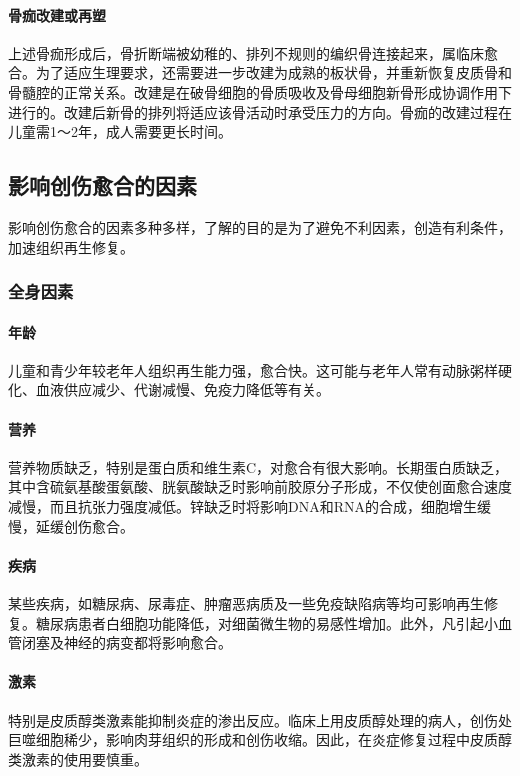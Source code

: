 \paragraph{骨痂改建或再塑}
上述骨痂形成后，骨折断端被幼稚的、排列不规则的编织骨连接起来，属临床愈合。为了适应生理要求，还需要进一步改建为成熟的板状骨，并重新恢复皮质骨和骨髓腔的正常关系。改建是在破骨细胞的骨质吸收及骨母细胞新骨形成协调作用下进行的。改建后新骨的排列将适应该骨活动时承受压力的方向。骨痂的改建过程在儿童需1～2年，成人需要更长时间。

\subsection{影响创伤愈合的因素}

影响创伤愈合的因素多种多样，了解的目的是为了避免不利因素，创造有利条件，加速组织再生修复。

\subsubsection{全身因素}

\paragraph{年龄}
儿童和青少年较老年人组织再生能力强，愈合快。这可能与老年人常有动脉粥样硬化、血液供应减少、代谢减慢、免疫力降低等有关。

\paragraph{营养}
营养物质缺乏，特别是蛋白质和维生素C，对愈合有很大影响。长期蛋白质缺乏，其中含硫氨基酸蛋氨酸、胱氨酸缺乏时影响前胶原分子形成，不仅使创面愈合速度减慢，而且抗张力强度减低。锌缺乏时将影响DNA和RNA的合成，细胞增生缓慢，延缓创伤愈合。

\paragraph{疾病}
某些疾病，如糖尿病、尿毒症、肿瘤恶病质及一些免疫缺陷病等均可影响再生修复。糖尿病患者白细胞功能降低，对细菌微生物的易感性增加。此外，凡引起小血管闭塞及神经的病变都将影响愈合。

\paragraph{激素}
特别是皮质醇类激素能抑制炎症的渗出反应。临床上用皮质醇处理的病人，创伤处巨噬细胞稀少，影响肉芽组织的形成和创伤收缩。因此，在炎症修复过程中皮质醇类激素的使用要慎重。

